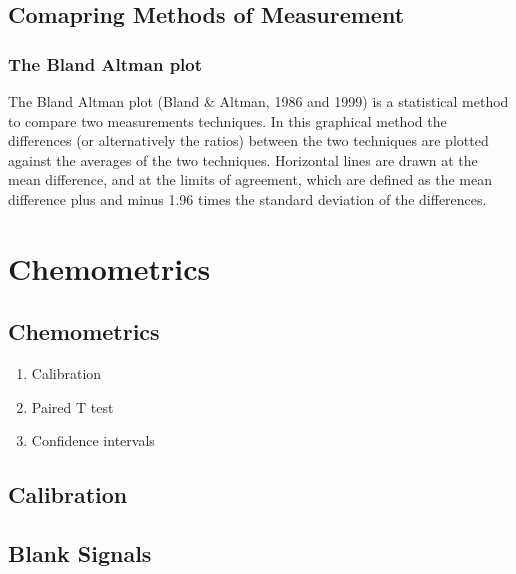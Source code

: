 \section{Comapring Methods of Measurement}

\subsection{The Bland Altman plot}
The Bland Altman plot (Bland \& Altman, 1986 and 1999) is a statistical method to compare two measurements techniques. In this graphical method the differences (or alternatively the ratios) between the two techniques are plotted against the averages of the two techniques. Horizontal lines are drawn at the mean difference, and at the limits of agreement, which are defined as the mean difference plus and minus 1.96 times the standard deviation of the differences.

\chapter{Chemometrics}

\section{Chemometrics}

\begin{enumerate}
	\item Calibration \item Paired T test \item Confidence intervals
\end{enumerate}


\section{Calibration}

\section{Blank Signals}
\newpage
